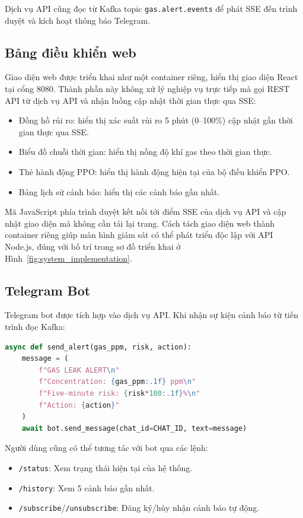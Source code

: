 Dịch vụ API cũng đọc từ Kafka topic \texttt{gas.alert.events} để phát SSE đến trình duyệt và kích hoạt thông báo Telegram.

\subsection{Bảng điều khiển web}

Giao diện web được triển khai như một container riêng, hiển thị giao diện React tại cổng 8080. Thành phần này không xử lý nghiệp vụ trực tiếp mà gọi REST API từ dịch vụ API và nhận luồng cập nhật thời gian thực qua SSE:

\begin{itemize}
  \item Đồng hồ rủi ro: hiển thị xác suất rủi ro 5 phút (0–100\%) cập nhật gần thời gian thực qua SSE.
  \item Biểu đồ chuỗi thời gian: hiển thị nồng độ khí gas theo thời gian thực.
  \item Thẻ hành động PPO: hiển thị hành động hiện tại của bộ điều khiển PPO.
  \item Bảng lịch sử cảnh báo: hiển thị các cảnh báo gần nhất.
\end{itemize}

Mã JavaScript phía trình duyệt kết nối tới điểm SSE của dịch vụ API và cập nhật giao diện mà không cần tải lại trang. Cách tách giao diện web thành container riêng giúp màn hình giám sát có thể phát triển độc lập với API Node.js, đúng với bố trí trong sơ đồ triển khai ở Hình~\ref{fig:system_implementation}.

\subsection{Telegram Bot}

Telegram bot được tích hợp vào dịch vụ API. Khi nhận sự kiện cảnh báo từ tiến trình đọc Kafka:

\begin{lstlisting}[language=Python, caption={Gửi cảnh báo qua Telegram}]
async def send_alert(gas_ppm, risk, action):
    message = (
        f"GAS LEAK ALERT\n"
        f"Concentration: {gas_ppm:.1f} ppm\n"
        f"Five-minute risk: {risk*100:.1f}%\n"
        f"Action: {action}"
    )
    await bot.send_message(chat_id=CHAT_ID, text=message)
\end{lstlisting}

Người dùng cũng có thể tương tác với bot qua các lệnh:
\begin{itemize}
  \item \texttt{/status}: Xem trạng thái hiện tại của hệ thống.
  \item \texttt{/history}: Xem 5 cảnh báo gần nhất.
  \item \texttt{/subscribe}/\texttt{/unsubscribe}: Đăng ký/hủy nhận cảnh báo tự động.
\end{itemize}

